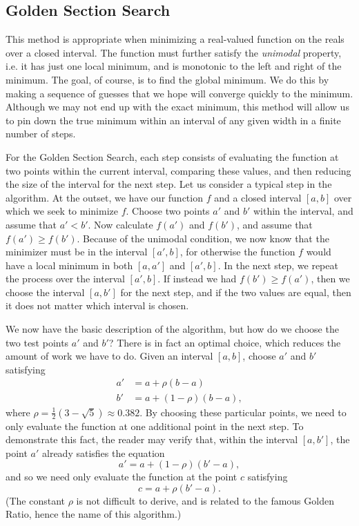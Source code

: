 \subsection*{Golden Section Search}
This method is appropriate when minimizing a real-valued function on the reals over a
closed interval. The function must further satisfy the \emph{unimodal} property, i.e.
it has just one local minimum, and is monotonic to the left and right of the minimum.
The goal, of course, is to find the
global minimum. We do this by making a sequence of guesses that we hope will converge
quickly to the minimum. Although we may not end up with the exact minimum, this method
will allow us to pin down the true minimum within an interval of any given width in a
finite number of steps.

For the Golden Section Search, each step consists of evaluating the function at two
points within the current interval, comparing these values, and then reducing the size
of the interval for the next step. Let us consider a typical step in the algorithm. At
the outset, we have our function $f$ and a closed interval $[a, b]$ over which we seek
to minimize $f$. Choose two points $a'$ and $b'$ within the interval, and assume that
$a' < b'$. Now calculate $f(a')$ and $f(b')$, and assume that $f(a') \geq f(b')$.
Because of the unimodal condition, we now know that the minimizer must be in the
interval $[a', b]$, for otherwise the function $f$ would have a local minimum in
both $[a, a']$ and $[a', b]$. In the next step, we repeat the process over the interval
$[a', b]$. If instead we had $f(b') \geq f(a')$, then we choose the interval $[a, b']$
for the next step, and if the two values are equal, then it does not matter which
interval is chosen.

We now have the basic description of the algorithm, but how do we choose the two test
points $a'$ and $b'$? There is in fact an optimal choice, which reduces the amount of
work we have to do. Given an interval $[a, b]$, choose $a'$ and $b'$ satisfying
\begin{align*}
a' &= a + \rho(b - a) \\
b' &= a + (1 - \rho)(b - a),
\end{align*}
where $\rho = \frac{1}{2}(3 - \sqrt{5}) \approx 0.382$. By choosing these particular
points, we need to only evaluate the function at one additional point in the next step.
To demonstrate this fact, the reader may verify that, within the interval $[a, b']$,
the point $a'$ already satisfies the equation
\begin{equation*}
a' = a + (1 - \rho)(b' - a),
\end{equation*}
and so we need only evaluate the function at the point $c$ satisfying
\begin{equation*}
c = a + \rho(b' - a).
\end{equation*}
(The constant $\rho$ is not difficult to derive, and is related to the famous Golden Ratio, hence the name of this algorithm.)

